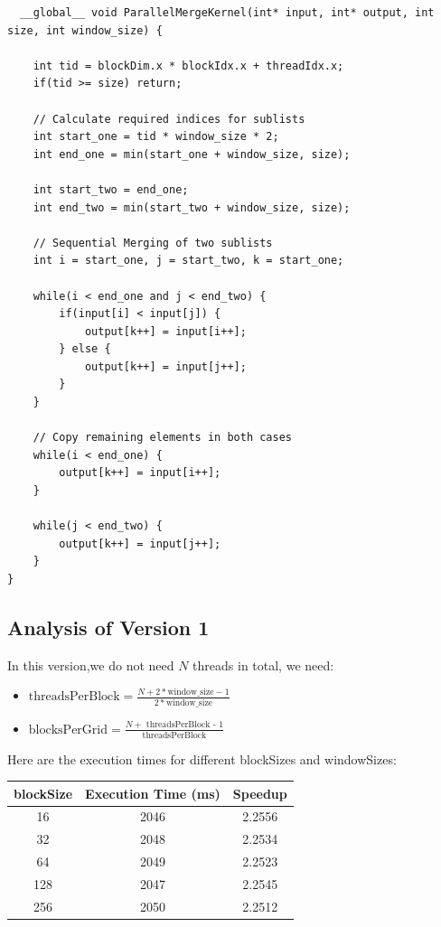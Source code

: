 \documentclass{article}
\begin{document}
\begin{lstlisting}
  __global__ void ParallelMergeKernel(int* input, int* output, int size, int window_size) {

    int tid = blockDim.x * blockIdx.x + threadIdx.x;
    if(tid >= size) return;

    // Calculate required indices for sublists
    int start_one = tid * window_size * 2;
    int end_one = min(start_one + window_size, size);

    int start_two = end_one;
    int end_two = min(start_two + window_size, size);

    // Sequential Merging of two sublists
    int i = start_one, j = start_two, k = start_one;

    while(i < end_one and j < end_two) {
        if(input[i] < input[j]) {
            output[k++] = input[i++];
        } else {
            output[k++] = input[j++];
        }
    }

    // Copy remaining elements in both cases
    while(i < end_one) {
        output[k++] = input[i++];
    }

    while(j < end_two) {
        output[k++] = input[j++];
    }
}
\end{lstlisting}

\subsection*{Analysis of Version 1}
In this version,we do not need $N$ threads in total, we need:
\begin{itemize}
  \item $\boxed{\text{threadsPerBlock} = {\frac{N + 2*\text{window\_size} - 1}{2*\text{window\_size}}}}$
  \item $\boxed{\text{blocksPerGrid} = \frac{N + \text{ threadsPerBlock - 1}}{\text{threadsPerBlock}}}$
\end{itemize}

Here are the execution times for different blockSizes and windowSizes:

\begin{center}
  \begin{tabular}{|c|c|c|}
    \hline
    \textbf{blockSize} & \textbf{Execution Time (ms)} & \textbf{Speedup} \\
    \hline

    16 & 2046 & 2.2556 \\
    32 & 2048 & 2.2534 \\
    64 & 2049 & 2.2523 \\
    128 & 2047 & 2.2545 \\
    256 & 2050 & 2.2512 \\
    
    \hline
  \end{tabular}
\end{center}
\end{document}
